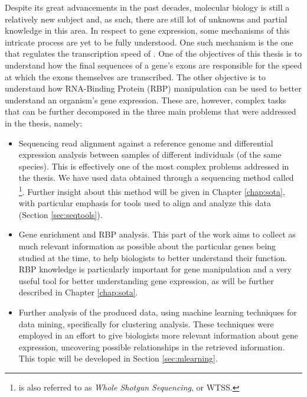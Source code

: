 Despite its great advancements in the past decades, molecular biology is still a
relatively new subject and, as such, there are still lot of unknowns and partial
knowledge in this area. In respect to gene expression, some mechanisms of this
intricate process are yet to be fully understood. One such mechanism is the one
that regulates the transcription speed of \rna. One of the objectives of this
thesis is to understand how the final sequences of a gene's exons are
responsible for the speed at which the exons themselves are transcribed. The
other objective is to understand how RNA-Binding Protein (RBP) manipulation can
be used to better understand an organism's gene expression. These are, however,
complex tasks that can be further decomposed in the three main problems that
were addressed in the thesis, namely:

\begin{itemize}

  \item
  Sequencing read alignment against a reference genome and differential
  expression analysis between samples of different individuals (of the same
  species). This is effectively one of the most complex problems addressed in
  the thesis. We have used data obtained through a sequencing method called
  \rnaseq{}\footnote{\rnaseq{} is also referred to as \textit{Whole \Trans{}
  Shotgun Sequencing}, or WTSS.}. Further insight about this method will be
  given in Chapter \ref{chap:sota}, with particular emphasis for tools used to
  align and analyze this data (Section \ref{sec:seqtools}).

  \item
  Gene enrichment and RBP analysis. This part of the work aims to collect as
  much relevant information as possible about the particular genes being studied
  at the time, to help biologists to better understand their function. RBP
  knowledge is particularly important for gene manipulation and a very useful
  tool for better understanding gene expression, as will be further described in
  Chapter \ref{chap:sota}.

  \item
  Further analysis of the produced data, using machine learning techniques for
  data mining, specifically for clustering analysis. These techniques were
  employed in an effort to give biologists more relevant information about gene
  expression, uncovering possible relationships in the retrieved information.
  This topic will be developed in Section \ref{sec:mlearning}.

\end{itemize}

